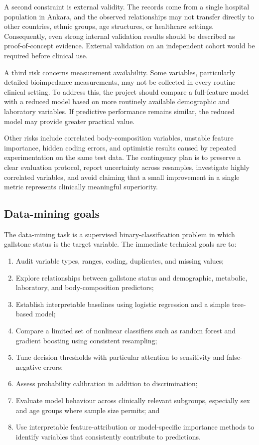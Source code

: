 A second constraint is external validity. The records come from a single hospital population in Ankara, and the observed relationships may not transfer directly to other countries, ethnic groups, age structures, or healthcare settings. Consequently, even strong internal validation results should be described as proof-of-concept evidence. External validation on an independent cohort would be required before clinical use.

A third risk concerns measurement availability. Some variables, particularly detailed bioimpedance measurements, may not be collected in every routine clinical setting. To address this, the project should compare a full-feature model with a reduced model based on more routinely available demographic and laboratory variables. If predictive performance remains similar, the reduced model may provide greater practical value.

Other risks include correlated body-composition variables, unstable feature importance, hidden coding errors, and optimistic results caused by repeated experimentation on the same test data. The contingency plan is to preserve a clear evaluation protocol, report uncertainty across resamples, investigate highly correlated variables, and avoid claiming that a small improvement in a single metric represents clinically meaningful superiority.

\subsection{Data-mining goals}
\label{subsec:data-mining-goals}

The data-mining task is a supervised binary-classification problem in which gallstone status is the target variable. The immediate technical goals are to:

\begin{enumerate}
    \item Audit variable types, ranges, coding, duplicates, and missing values;
    \item Explore relationships between gallstone status and demographic, metabolic, laboratory, and body-composition predictors;
    \item Establish interpretable baselines using logistic regression and a simple tree-based model;
    \item Compare a limited set of nonlinear classifiers such as random forest and gradient boosting using consistent resampling;
    \item Tune decision thresholds with particular attention to sensitivity and false-negative errors;
    \item Assess probability calibration in addition to discrimination;
    \item Evaluate model behaviour across clinically relevant subgroups, especially sex and age groups where sample size permits; and
    \item Use interpretable feature-attribution or model-specific importance methods to identify variables that consistently contribute to predictions.
\end{enumerate}


